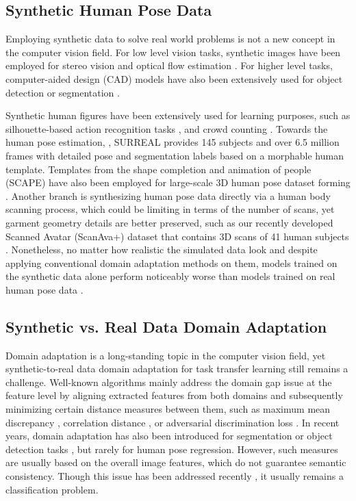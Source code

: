 \documentclass[twocolumn]{svjour3}          \smartqed  \usepackage{graphicx}
\begin{document}
\subsection{Synthetic Human Pose Data}
Employing synthetic data to solve real world problems is not a new concept in the computer vision field.  For low level vision tasks, synthetic images have been employed for stereo vision \cite{peris2012towards} and optical flow estimation \cite{butler2012naturalistic}. For higher level tasks, computer-aided design (CAD) models have also been extensively used for object detection \cite{liebelt2010multi,peng2015learning,marin2010learning}  or segmentation \cite{hong2018virtual}. 

Synthetic human figures have  been extensively used for learning purposes, such as silhouette-based action recognition tasks \cite{ragheb2008vihasi}, and crowd counting \cite{wang2019learning}.
Towards the human pose estimation,  \cite{varol17_surreal}, SURREAL provides 145 subjects and over 6.5 million frames with detailed pose and segmentation labels based on a morphable human template.
Templates from the shape completion and animation of people (SCAPE) \cite{anguelov2005scape}  have also been employed for large-scale 3D human pose dataset forming \cite{chen2016synthesizing}. 
Another branch is synthesizing human pose data directly via a human body scanning process, which could be limiting in terms of the number of scans, yet garment geometry details are better preserved, such as our recently developed Scanned Avatar (ScanAva+) dataset that contains 3D scans of 41 human subjects \cite{liu2018semi}. Nonetheless, no matter how realistic the simulated data look and despite applying conventional domain adaptation methods on them, models trained on the synthetic data alone perform noticeably worse than models trained on real human pose data \cite{chen2016synthesizing}. 




\subsection{Synthetic vs. Real Data Domain Adaptation}
Domain adaptation is a long-standing topic in the computer vision field, yet  synthetic-to-real data domain adaptation for task transfer learning  still remains a challenge. Well-known algorithms mainly address the domain gap issue at the feature level by aligning extracted features from both domains and subsequently minimizing certain distance measures between them, such as maximum mean discrepancy \cite{long2015learning}, correlation distance \cite{sun2016deep}, or adversarial discrimination loss \cite{ganin2016domain,tzeng2015simultaneous}. In recent years, domain adaptation has also been introduced for segmentation \mbox{\cite{hoffman2018cycada,luo2019taking,vu2019advent}} or object detection tasks \mbox{\cite{raj2015subspace,gopalan2011domain,chen2018domain,zheng2020cross}}, but rarely for human pose regression. 
However, such measures are usually based on the overall image features, which do not guarantee semantic consistency. Though this issue has been addressed recently \mbox{\cite{Luo_2019_CVPR}}, it usually remains a classification problem.
\end{document}
